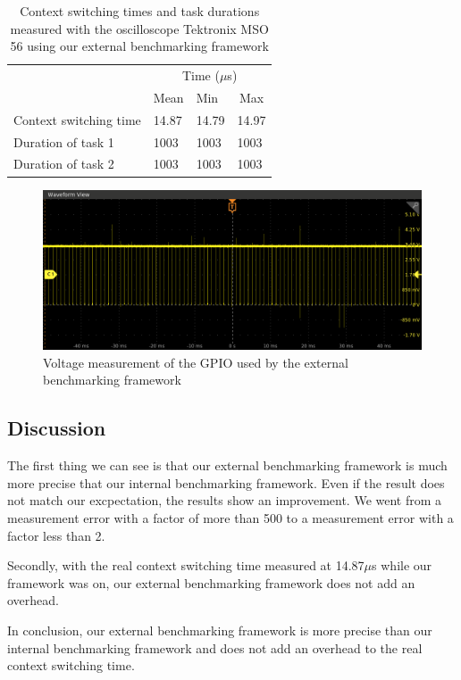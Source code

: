 \begin{table}[!ht]
  \centering
  \begin{tabular}{llll}
                        & \multicolumn{3}{c}{Time ($\mu$s)}                             \\ \cline{2-4} 
                        & \multicolumn{1}{c}{Mean} & Min  & \multicolumn{1}{c}{Max} \\ \cline{2-4} 
  Context switching time & 14.87                     & 14.79 & 14.97                    \\
  Duration of task 1    & 1003                     & 1003 & 1003                    \\
  Duration of task 2    & 1003                     & 1003 & 1003                   
  \end{tabular}
  \caption{Context switching times and task durations measured with the oscilloscope Tektronix MSO 56 using our external benchmarking framework}
  \label{tab:external-oscilloscope-framework-measurement}
\end{table}

\begin{figure}[!ht]
  \centering
  \includegraphics[scale=0.5]{assets/external-framework-value-wave.png}
  \caption{\label{fig:external-framework-value-wave}Voltage measurement of the GPIO used by the external benchmarking framework}
\end{figure}

\subsection{Discussion}

The first thing we can see is that our external benchmarking framework is much more precise that our internal benchmarking framework.
Even if the result does not match our excpectation, the results show an improvement.
We went from a measurement error with a factor of more than 500 to a measurement error with a factor less than 2.

Secondly, with the real context switching time measured at 14.87$\mu$s while our framework was on, our external benchmarking framework does not add an overhead.

In conclusion, our external benchmarking framework is more precise than our internal benchmarking framework and does not add an overhead to the real context switching time.